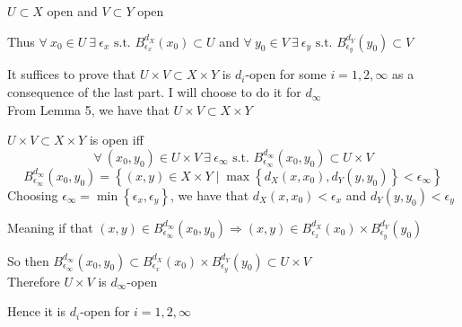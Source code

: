 \documentclass{article}
\begin{document}
\begin{problem}
\begin{solution}
	\( U \subset X \) open and \( V \subset Y \) open

	Thus \( \forall \ x_{0} \in  U \ \exists \ \epsilon_x \text{ s.t. } B_{\epsilon_x}^{d_X}(x_{0}) \subset U \) and \( \forall \ y_{0} \in V \ \exists \ \epsilon_y \text{ s.t. } B_{\epsilon_y}^{d_Y}(y_{0}) \subset V \)

	It suffices to prove that \( U \times V \subset X \times Y \) is \( d_i \)-open for some \( i = 1,2,\infty \) as a consequence of the last part. I will choose to do it for \( d_{\infty} \)
	\\

	From Lemma 5, we have that \( U \times V \subset X \times Y \)

	\( U \times V \subset X \times Y \) is open iff
	\[
		\forall \ (x_{0},y_{0}) \in U \times V \ \exists \ \epsilon_{\infty} \text{ s.t. } B_{\epsilon_{\infty}}^{d_{\infty}}(x_{0},y_{0}) \subset U \times V
	\]
	\[
		B_{{\epsilon_{\infty}}}^{d_{\infty}}(x_{0},y_{0}) = \left\{ (x,y) \in X \times Y \mid \max\left\{ d_X(x,x_{0}),d_Y(y,y_{0}) \right\} < \epsilon_{\infty} \right\}
	\]
	Choosing \( \epsilon_{\infty} = \min\left\{ \epsilon_x,\epsilon_y \right\}  \), we have that \( d_X(x,x_{0}) < \epsilon_x \) and \( d_Y(y,y_{0}) < \epsilon_y \)

	Meaning if that \( (x,y) \in B_{\epsilon_{\infty}}^{d_{\infty}}(x_{0},y_{0}) \Rightarrow (x,y) \in B_{\epsilon_x}^{d_X}(x_{0}) \times B_{\epsilon_y}^{d_Y}(y_{0}) \)

	So then \( B_{\epsilon_{\infty}}^{d_{\infty}}(x_{0},y_{0}) \subset B_{\epsilon_x}^{d_X}(x_{0}) \times B_{\epsilon_y}^{d_Y}(y_{0}) \subset U \times V \)
	\\

	Therefore \( U \times V \) is \( d_{\infty} \)-open

	Hence it is \( d_i \)-open for \( i = 1,2,\infty \)

\end{solution}



\end{problem}
\end{document}

